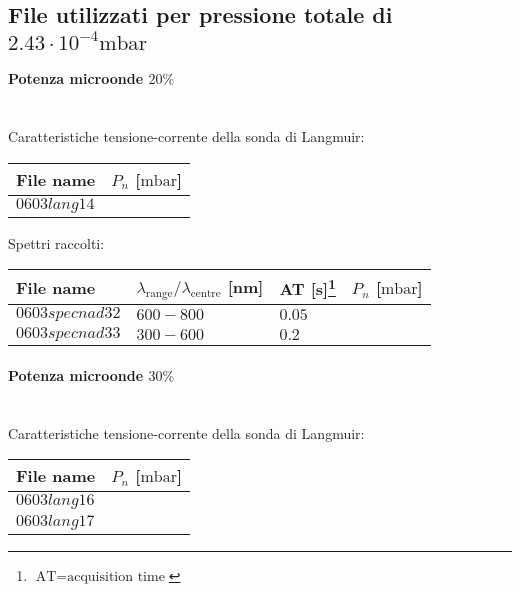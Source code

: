 \subsection{File utilizzati per pressione totale di $2.43\cdot10^{-4}\si{\milli\bar}$}

\paragraph*{Potenza microonde $\text{20\%}$}~\\
Caratteristiche tensione-corrente della sonda di Langmuir:
\begin{center}
\begin{tabular}{p{3cm}p{3cm}}
\toprule
File name	&$P_{n}$ [$\si{\milli\bar}$]\\
\midrule
$0603lang14$	&$  $\\
\bottomrule
\end{tabular}
\end{center}

Spettri raccolti:
\begin{center}
\begin{tabular}{p{3cm}p{4cm}p{2cm}p{3cm}}
\toprule
File name	&$\lambda_\text{range}\text{/}\lambda_\text{centre}$ [nm] &AT [s]\footnote{$\text{AT}=\text{acquisition time}$} &$P_{n}$ [$\si{\milli\bar}$]\\
\midrule
$0603specnad32$	&$600-800$	&$0.05$		&$  $\\
$0603specnad33$	&$300-600$	&$0.2$		&$  $\\
\bottomrule
\end{tabular}
\end{center}

\paragraph*{Potenza microonde $\text{30\%}$} ~\\
Caratteristiche tensione-corrente della sonda di Langmuir:
\begin{center}
  \begin{tabular}{p{3cm}p{3cm}}
  \toprule
File name	&$P_{n}$ [$\si{\milli\bar}$]\\
  \midrule
$0603lang16$	&$  $\\
$0603lang17$	&$  $\\
  \bottomrule
  \end{tabular}
\end{center}


